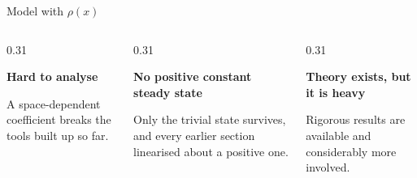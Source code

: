 \begin{frame}{Model with $\rho(x)$}
\begin{columns}[c,onlytextwidth]
  \end{columns}

  \vspace{0.24cm}

  \begin{columns}[T,onlytextwidth]

    \begin{column}{0.31\textwidth}
      {\color{HydraWhite}\bfseries\fontsize{8.0}{9.8}\selectfont
        Hard to analyse\par}
      \vspace{-0.04cm}
      {\color{HydraBody}\fontsize{6.6}{8.3}\selectfont
        A space-dependent coefficient breaks the tools built up so far.\par}
    \end{column}

    \begin{column}{0.31\textwidth}
      {\color{HydraWhite}\bfseries\fontsize{8.0}{9.8}\selectfont
        No positive constant steady state\par}
      \vspace{-0.04cm}
      {\color{HydraBody}\fontsize{6.6}{8.3}\selectfont
        Only the trivial state survives, and every earlier section
        linearised about a positive one.\par}
    \end{column}

    \begin{column}{0.31\textwidth}
      {\color{HydraWhite}\bfseries\fontsize{8.0}{9.8}\selectfont
        Theory exists, but it is heavy\par}
      \vspace{-0.04cm}
      {\color{HydraBody}\fontsize{6.6}{8.3}\selectfont
        Rigorous results are available and considerably more involved.\par}
    \end{column}

  \end{columns}

\end{frame}




